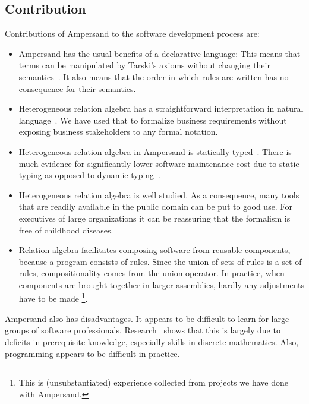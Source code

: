 \documentclass{svproc}
\begin{document}
\subsection{Contribution}
\label{sct:Contribution}
	Contributions of Ampersand to the software development process are:
\begin{itemize}
\item	Ampersand has the usual benefits of a declarative language:
	This means that terms can be manipulated by Tarski's axioms without changing their semantics~\cite{vdWoude2011}.
	It also means that the order in which rules are written has no consequence for their semantics.
\item	Heterogeneous relation algebra has a straightforward interpretation in natural language~\cite{RBD}.
	We have used that to formalize business requirements without exposing business stakeholders to any formal notation.
\item	Heterogeneous relation algebra in Ampersand is statically typed~\cite{Joosten2015}.
	There is much evidence for significantly lower software maintenance cost due to static typing as opposed to dynamic typing~\cite{HanenbergKRTS14,Petersen2014}.
\item	Heterogeneous relation algebra is well studied.
	As a consequence, many tools that are readily available in the public domain can be put to good use.
	For executives of large organizations it can be reassuring that the formalism is free of childhood diseases.
\item	Relation algebra facilitates composing software from reusable components, because a program consists of rules.
	Since the union of sets of rules is a set of rules, compositionality comes from the union operator.
	In practice, when components are brought together in larger assemblies, hardly any adjustments have to be made%
\footnote{This is (unsubstantiated) experience collected from projects we have done with Ampersand.}.
\end{itemize}

	Ampersand also has disadvantages. It appears to be difficult to learn for large groups of software professionals.
	Research~\cite{Michels2015} shows that this is largely due to deficits in prerequisite knowledge, especially skills in discrete mathematics.
	Also, programming appears to be difficult in practice.
\end{document}
